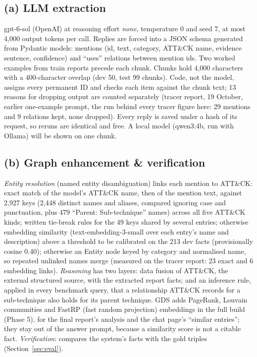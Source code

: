 \documentclass[10pt]{article}
\begin{document}
\subsection*{(a) LLM extraction} gpt-6-sol (OpenAI) at reasoning effort \emph{none}, temperature 0 and seed 7, at most 4,000 output tokens per call. Replies are forced into a JSON schema generated from Pydantic models: mentions (id, text, category, ATT\&CK name, evidence sentence, confidence) and ``uses'' relations between mention ids. Two worked examples from train reports precede each chunk. Chunks hold 4,000 characters with a 400-character overlap (dev 50, test 99 chunks). Code, not the model, assigns every permanent ID and checks each item against the chunk text; 13 reasons for dropping output are counted separately (tracer report, 19 October, earlier one-example prompt, the run behind every tracer figure here: 29 mentions and 9 relations kept, none dropped). Every reply is saved under a hash of its request, so reruns are identical and free. A local model (qwen3:4b, run with Ollama) will be shown on one chunk.

\subsection*{(b) Graph enhancement \& verification} \emph{Entity resolution} (named entity disambiguation) links each mention to ATT\&CK: exact match of the model's ATT\&CK name, then of the mention text, against 2,927 keys (2,448 distinct names and aliases, compared ignoring case and punctuation, plus 479 ``Parent: Sub-technique'' names) across all five ATT\&CK kinds; written tie-break rules for the 49 keys shared by several entries; otherwise embedding similarity (text-embedding-3-small over each entry's name and description) above a threshold to be calibrated on the 213 dev facts (provisionally cosine 0.40); otherwise an Entity node keyed by category and normalised name, so repeated unlinked names merge (measured on the tracer report: 23 exact and 6 embedding links). \emph{Reasoning} has two layers: data fusion of ATT\&CK, the external structured source, with the extracted report facts; and an inference rule, applied in every benchmark query, that a relationship ATT\&CK records for a sub-technique also holds for its parent technique. GDS adds PageRank, Louvain communities \cite{8} and FastRP (fast random projection) embeddings in the full build (Phase 5), for the final report's analysis and the chat page's ``similar entries''; they stay out of the answer prompt, because a similarity score is not a citable fact. \emph{Verification}:  compares the system's facts with the gold triples (Section~\ref{sec:eval}).
\end{document}
